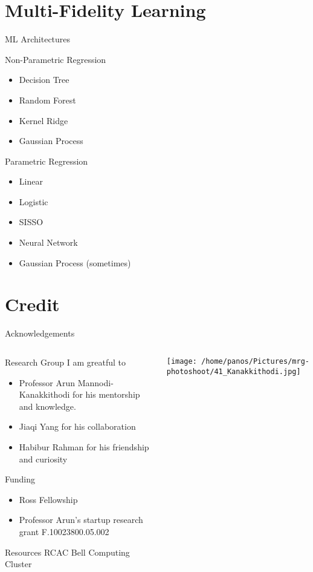 \documentclass[10pt, aspectratio=169, presentation]{beamer}
\begin{document}
\section{Multi-Fidelity Learning}
\label{sec:org95b04b4}
\begin{frame}[label={sec:org940ce11}]{ML Architectures}
\begin{block}{Non-Parametric Regression}
\begin{itemize}
\item Decision Tree
\item Random Forest
\item Kernel Ridge
\item Gaussian Process
\end{itemize}
\end{block}
\begin{block}{Parametric Regression}
\begin{itemize}
\item Linear
\item Logistic
\item SISSO
\item Neural Network
\item Gaussian Process (sometimes)
\end{itemize}
\end{block}
\end{frame}

\section{Credit}
\label{sec:org1328192}
\begin{frame}[label={sec:org4427712}]{Acknowledgements}
\begin{columns}
\begin{column}{0.6\columnwidth}
\begin{block}{Research Group}
I am greatful to
\begin{itemize}
\item Professor Arun Mannodi-Kanakkithodi for his mentorship and knowledge.
\item Jiaqi Yang for his collaboration
\item Habibur Rahman for his friendship and curiosity
\end{itemize}
\end{block}
\begin{block}{Funding}
\begin{itemize}
\item Ross Fellowship
\item Professor Arun's startup research grant F.10023800.05.002
\end{itemize}
\end{block}
\begin{block}{Resources}
RCAC Bell Computing Cluster
\end{block}
\end{column}
\begin{column}{0.4\columnwidth}
\hspace*{-1cm}
\texttt{[image: /home/panos/Pictures/mrg-photoshoot/41\_Kanakkithodi.jpg]}
\end{column}
\end{columns}
\end{frame}
\end{document}
